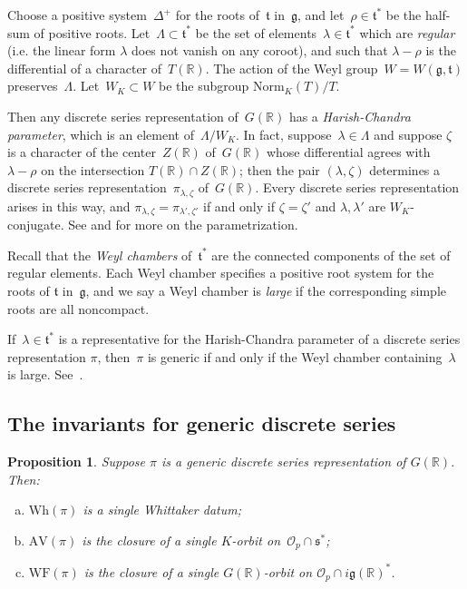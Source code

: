 \documentclass[cupthm]{CUP-JNL-JMJ}
\numberwithin{equation}{section}
\theoremstyle{cupplain}
\newtheorem{proposition}{Proposition}[section]
\theoremstyle{cupdefinition}
\theoremstyle{cupremark}
\theoremstyle{cupproof}
\newcommand{\R}{\mathbb R}
\renewcommand{\t}{\mathfrak t}
\newcommand{\g}{\mathfrak g}
\newcommand{\s}{\mathfrak s}
\newcommand{\AV}{\mathrm{AV}}
\newcommand{\Wh}{\mathrm{Wh}}
\newcommand{\WF}{\mathrm{WF}}
\begin{document}
Choose a  positive system~$\Delta^+$  for the roots of~$\t$ in~$\g$, and let~$\rho \in \mathfrak{t}^\ast$ be the half-sum of positive roots. Let~$\Lambda \subset \mathfrak{t}^\ast$ be the set of elements~$\lambda \in \mathfrak{t}^\ast$ which are \emph{regular} (i.e. the linear form $\lambda$ does not vanish on any coroot), and such that $\lambda-\rho$  is the differential of a character of~$T(\R)$. The action of the Weyl group~$W=W(\g, \t)$ preserves~$\Lambda$. Let~$W_K\subset W$ be the subgroup $\mathrm{Norm}_K(T)/T$. 


Then any discrete series representation of~$G(\R)$ has a \emph{Harish-Chandra parameter}, which is an element of~$\Lambda/W_K$. In fact, suppose~$\lambda \in \Lambda$ and suppose $\zeta$ is a character of the center~$Z(\R)$ of~$G(\R)$ whose differential agrees with~$\lambda-\rho$ on the intersection $T(\R) \cap Z(\R)$; then the pair $(\lambda, \zeta)$  determines a discrete series representation~$\pi_{\lambda, \zeta}$ of~$G(\R)$. Every discrete series representation arises in this way, and $\pi_{\lambda, \zeta}=\pi_{\lambda', \zeta'}$ if and only if $\zeta=\zeta'$ and $\lambda, \lambda'$ are $W_K$-conjugate. See  \cite[Section 8]{AV1} and \cite{Contragredient} for more on the parametrization.  

Recall that the \emph{Weyl chambers} of~$\mathfrak{t}^\ast$ are the connected components of the set of regular elements. Each Weyl chamber specifies a positive root system for the roots of $\mathfrak{t}$ in~$\g$, and we say a Weyl chamber is \emph{large} if the corresponding simple roots are all noncompact. 

If~$\lambda \in \mathfrak{t}^\ast$ is a representative for the Harish-Chandra parameter of a discrete series representation $\pi$, then~$\pi$ is generic if and only if the Weyl chamber containing~$\lambda$ is large. See~\cite[Section 6]{vogan-gelfand-kirillov}.


\subsection{The invariants for generic discrete series}
\medskip

\begin{proposition} \label{invariants_ds}
  Suppose $\pi$ is a generic discrete series representation of $G(\R)$. Then\textup{:}
\begin{enumerate}[(a)]
\item $\Wh(\pi)$ is a single Whittaker datum\textup{;}
\item $\AV(\pi)$ is the closure of a single $K$-orbit on~$\mathcal{O}_p \cap \s^*$\textup{;}
\item  $\WF(\pi)$ is the closure of a single $G(\R)$-orbit on $\mathcal{O}_p \cap  i \g(\R)^*$\textup{.}
\end{enumerate}
\end{proposition}
\end{document}
